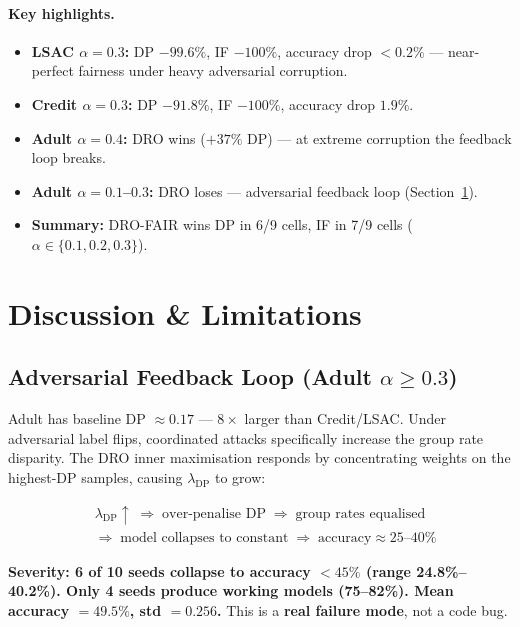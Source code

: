 \documentclass[11pt,a4paper]{article}
\newcommand{\lDP}{\lambda_{\mathrm{DP}}}
\begin{document}
\paragraph{Key highlights.}
\begin{itemize}
\item \textbf{LSAC $\alpha=0.3$:} DP $-99.6\%$, IF $-100\%$, accuracy drop $<0.2\%$ ---
  near-perfect fairness under heavy adversarial corruption.
\item \textbf{Credit $\alpha=0.3$:} DP $-91.8\%$, IF $-100\%$, accuracy drop $1.9\%$.
\item \textbf{Adult $\alpha=0.4$:} DRO wins ($+37\%$ DP) --- at extreme corruption the
  feedback loop breaks.
\item \textbf{Adult $\alpha=0.1$--$0.3$:} DRO loses --- adversarial feedback loop
  (Section~\ref{sec:discussion}).
\item \textbf{Summary:} DRO-FAIR wins DP in 6/9 cells, IF in 7/9 cells
  ($\alpha\in\{0.1,0.2,0.3\}$).
\end{itemize}

\section{Discussion \& Limitations}
\label{sec:discussion}

\subsection{Adversarial Feedback Loop (Adult $\alpha\ge 0.3$)}

Adult has baseline DP $\approx 0.17$ --- $8\times$ larger than Credit/LSAC.
Under adversarial label flips, coordinated attacks specifically increase the
group rate disparity.  The DRO inner maximisation responds by concentrating
weights on the highest-DP samples, causing $\lDP$ to grow:

\begin{align*}
  &\lDP\!\uparrow
  \;\Rightarrow\;\text{over-penalise DP}
  \;\Rightarrow\;\text{group rates equalised}\\
  &\Rightarrow\;\text{model collapses to constant}
  \;\Rightarrow\;\text{accuracy}\approx 25\text{--}40\%
\end{align*}

\begin{notebox}
\textbf{Severity: 6 of 10 seeds collapse to accuracy $<45\%$ (range 24.8\%--40.2\%).
Only 4 seeds produce working models (75--82\%).  Mean accuracy $= 49.5\%$,
std $= 0.256$.}  This is a \textbf{real failure mode}, not a code bug.
\end{notebox}
\end{document}
